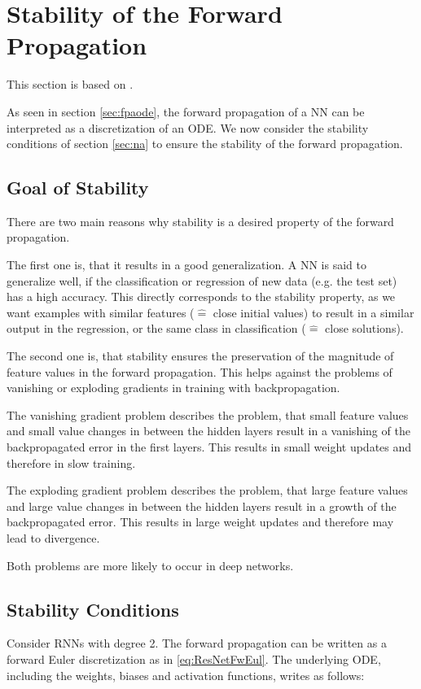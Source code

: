 \documentclass[a4paper, 12pt]{scrreprt} %
\begin{document}
\section{Stability of the Forward Propagation}
\label{sec:SotFP}
This section is based on \cite{safdnn}.

As seen in section \ref{sec:fpaode}, the forward propagation of a \ac{NN} can be interpreted as a discretization of an \ac{ODE}. We now consider the stability conditions of section \ref{sec:na} to ensure the stability of the forward propagation. 

\subsection{Goal of Stability}
There are two main reasons why stability is a desired property of the forward propagation. \newline

The first one is, that it results in a good generalization. A \ac{NN} is said to generalize well, if the classification or regression of new data (e.g. the test set) has a high accuracy. This directly corresponds to the stability property, as we want examples with similar features ($\widehat{=}$ close initial values) to result in a similar output in the regression, or the same class in classification ($\widehat{=}$ close solutions). \newline

The second one is, that stability ensures the preservation of the magnitude of feature values in the forward propagation. This helps against the problems of vanishing or exploding gradients in training with backpropagation. 

The vanishing gradient problem describes the problem, that small feature values and small value changes in between the hidden layers result in a vanishing of the backpropagated error in the first layers. This results in small weight updates and therefore in slow training. 

The exploding gradient problem describes the problem, that large feature values and large value changes in between the hidden layers result in a growth of the backpropagated error. This results in large weight updates and therefore may lead to divergence.

Both problems are more likely to occur in deep networks.

\subsection{Stability Conditions}
Consider \acp{RNN} with degree 2. The forward propagation can be written as a forward Euler discretization as in \ref{eq:ResNetFwEul}. The underlying \ac{ODE}, including the weights, biases and activation functions, writes as follows:
\end{document}
